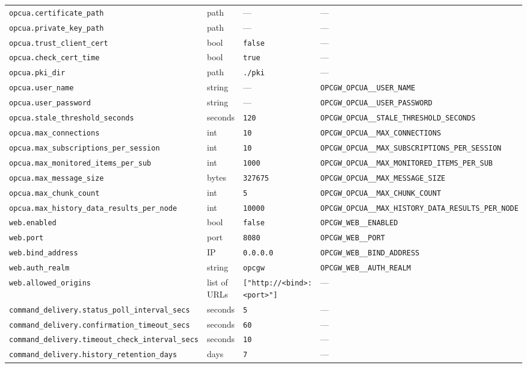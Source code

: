 \begin{longtable}[]{@{}llll@{}}
\texttt{opcua.certificate\_path} & path & --- & --- \\
\texttt{opcua.private\_key\_path} & path & --- & --- \\
\texttt{opcua.trust\_client\_cert} & bool & \texttt{false} & --- \\
\texttt{opcua.check\_cert\_time} & bool & \texttt{true} & --- \\
\texttt{opcua.pki\_dir} & path & \texttt{./pki} & --- \\
\texttt{opcua.user\_name} & string & --- & \texttt{OPCGW\_OPCUA\_\_USER\_NAME} \\
\texttt{opcua.user\_password} & string & --- & \texttt{OPCGW\_OPCUA\_\_USER\_PASSWORD} \\
\texttt{opcua.stale\_threshold\_seconds} & seconds & \texttt{120} & \texttt{OPCGW\_OPCUA\_\_STALE\_THRESHOLD\_SECONDS} \\
\texttt{opcua.max\_connections} & int & \texttt{10} & \texttt{OPCGW\_OPCUA\_\_MAX\_CONNECTIONS} \\
\texttt{opcua.max\_subscriptions\_per\_session} & int & \texttt{10} & \texttt{OPCGW\_OPCUA\_\_MAX\_SUBSCRIPTIONS\_PER\_SESSION} \\
\texttt{opcua.max\_monitored\_items\_per\_sub} & int & \texttt{1000} & \texttt{OPCGW\_OPCUA\_\_MAX\_MONITORED\_ITEMS\_PER\_SUB} \\
\texttt{opcua.max\_message\_size} & bytes & \texttt{327675} & \texttt{OPCGW\_OPCUA\_\_MAX\_MESSAGE\_SIZE} \\
\texttt{opcua.max\_chunk\_count} & int & \texttt{5} & \texttt{OPCGW\_OPCUA\_\_MAX\_CHUNK\_COUNT} \\
\texttt{opcua.max\_history\_data\_results\_per\_node} & int & \texttt{10000} & \texttt{OPCGW\_OPCUA\_\_MAX\_HISTORY\_DATA\_RESULTS\_PER\_NODE} \\
\texttt{web.enabled} & bool & \texttt{false} & \texttt{OPCGW\_WEB\_\_ENABLED} \\
\texttt{web.port} & port & \texttt{8080} & \texttt{OPCGW\_WEB\_\_PORT} \\
\texttt{web.bind\_address} & IP & \texttt{0.0.0.0} & \texttt{OPCGW\_WEB\_\_BIND\_ADDRESS} \\
\texttt{web.auth\_realm} & string & \texttt{opcgw} & \texttt{OPCGW\_WEB\_\_AUTH\_REALM} \\
\texttt{web.allowed\_origins} & list of URLs & \texttt{{[}"http://\textless{}bind\textgreater{}:\textless{}port\textgreater{}"{]}} & --- \\
\texttt{command\_delivery.status\_poll\_interval\_secs} & seconds & \texttt{5} & --- \\
\texttt{command\_delivery.confirmation\_timeout\_secs} & seconds & \texttt{60} & --- \\
\texttt{command\_delivery.timeout\_check\_interval\_secs} & seconds & \texttt{10} & --- \\
\texttt{command\_delivery.history\_retention\_days} & days & \texttt{7} & --- \\
\end{longtable}

